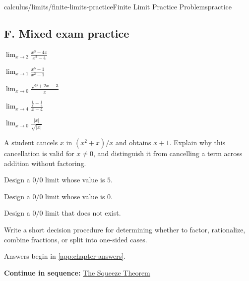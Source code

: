 \documentclass[11pt,openany]{book}
\theoremstyle{bgplain}
\newcommand{\webnext}[2]{%
  \par\addvspace{1.2em}\noindent{\color{BGLine}\rule{\textwidth}{0.35pt}}\par\smallskip
  {\small\color{BGGray}\textbf{Continue in sequence:} \hyperlink{web:#1}{#2}}\par
}
\begin{document}
\begin{webpage}{calculus/limits/finite-limits-practice}{Finite Limit Practice Problems}{practice}
\subsection*{F. Mixed exam practice}
\begin{bgexercises}[label=\textbf{2.\arabic*},resume]
  \item \(\displaystyle\lim_{x\to2}\frac{x^3-4x}{x^2-4}\)
  \item \(\displaystyle\lim_{x\to1}\frac{x^5-1}{x^2-1}\)
  \item \(\displaystyle\lim_{x\to0}\frac{\sqrt{9+2x}-3}{x}\)
  \item \(\displaystyle\lim_{x\to4}\frac{\frac1x-\frac14}{x-4}\)
  \item \(\displaystyle\lim_{x\to0}\frac{|x|}{\sqrt{|x|}}\)
  \item A student cancels \(x\) in \((x^2+x)/x\) and obtains \(x+1\). Explain why this cancellation is valid for \(x\ne0\), and distinguish it from cancelling a term across addition without factoring.
  \item Design a \(0/0\) limit whose value is \(5\).
  \item Design a \(0/0\) limit whose value is \(0\).
  \item Design a \(0/0\) limit that does not exist.
  \item Write a short decision procedure for determining whether to factor, rationalize, combine fractions, or split into one-sided cases.
\end{bgexercises}

Answers begin in \cref{app:chapter-answers}.
\webnext{calculus/limits/squeeze-theorem}{The Squeeze Theorem}
\end{webpage}


\end{document}
